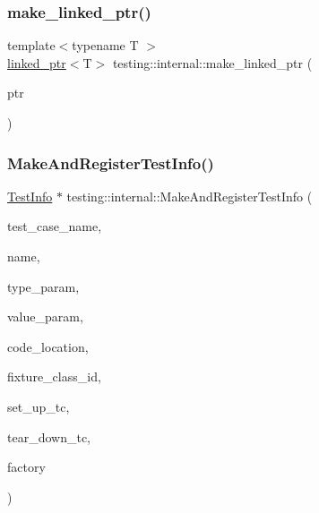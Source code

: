 \mbox{\label{namespacetesting_1_1internal_a0d79fad1f772844eff35dfe955f24fd6}} 
\subsubsection{\texorpdfstring{make\+\_\+linked\+\_\+ptr()}{make\_linked\_ptr()}}
{\footnotesize\ttfamily template$<$typename T $>$ \\
\hyperlink{classtesting_1_1internal_1_1linked__ptr}{linked\+\_\+ptr}$<$T$>$ testing\+::internal\+::make\+\_\+linked\+\_\+ptr (\begin{DoxyParamCaption}\item[{T $\ast$}]{ptr }\end{DoxyParamCaption})}

\mbox{\label{namespacetesting_1_1internal_a7f2e4e46c969fcae9d801d93a3e932fd}} 
\subsubsection{\texorpdfstring{Make\+And\+Register\+Test\+Info()}{MakeAndRegisterTestInfo()}}
{\footnotesize\ttfamily \hyperlink{classtesting_1_1_test_info}{Test\+Info} $\ast$ testing\+::internal\+::\+Make\+And\+Register\+Test\+Info (\begin{DoxyParamCaption}\item[{const char $\ast$}]{test\+\_\+case\+\_\+name,  }\item[{const char $\ast$}]{name,  }\item[{const char $\ast$}]{type\+\_\+param,  }\item[{const char $\ast$}]{value\+\_\+param,  }\item[{\hyperlink{structtesting_1_1internal_1_1_code_location}{Code\+Location}}]{code\+\_\+location,  }\item[{\hyperlink{namespacetesting_1_1internal_ab1114197d3c657d8b7f8e0c5caa12d00}{Type\+Id}}]{fixture\+\_\+class\+\_\+id,  }\item[{\hyperlink{namespacetesting_1_1internal_a30037044c0b57cdd647c7e2e97cb2cff}{Set\+Up\+Test\+Case\+Func}}]{set\+\_\+up\+\_\+tc,  }\item[{\hyperlink{namespacetesting_1_1internal_a085e31321d0d029c04d2a79234f60c1a}{Tear\+Down\+Test\+Case\+Func}}]{tear\+\_\+down\+\_\+tc,  }\item[{\hyperlink{classtesting_1_1internal_1_1_test_factory_base}{Test\+Factory\+Base} $\ast$}]{factory }\end{DoxyParamCaption})}

